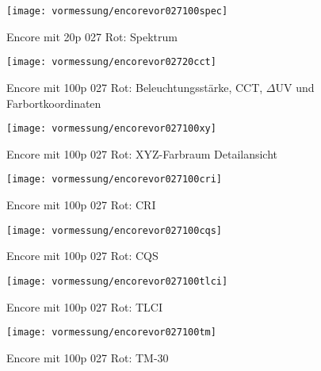 \documentclass[pagesize,paper=A4,fontsize=12pt,utf8,numbers=noenddot,bibliography=totoc,listof=totoc,DIV=11,BCOR=1mm]{scrreprt}
\begin{document}
\begin{figure}[htp]     %
\centering
\texttt{[image: vormessung/encorevor027100spec]} 
\caption {Encore mit 20p 027 Rot: Spektrum} 
\end{figure}

\begin{figure}[htp]     %
\centering
\texttt{[image: vormessung/encorevor02720cct]} 
\caption {Encore mit 100p 027 Rot: Beleuchtungsstärke, CCT, $\Delta$UV und Farbortkoordinaten} 
\end{figure}

\begin{figure}[htp]     %
\centering
\texttt{[image: vormessung/encorevor027100xy]} 
\caption {Encore mit 100p 027 Rot: XYZ-Farbraum Detailansicht} 
\end{figure}

\begin{figure}[htp]     %
\centering
\texttt{[image: vormessung/encorevor027100cri]} 
\caption {Encore mit 100p 027 Rot: CRI} 
\end{figure}

\begin{figure}[htp]     %
\centering
\texttt{[image: vormessung/encorevor027100cqs]} 
\caption {Encore mit 100p 027 Rot: CQS} 
\end{figure}

\begin{figure}[htp]     %
\centering
\texttt{[image: vormessung/encorevor027100tlci]} 
\caption {Encore mit 100p 027 Rot: TLCI} 
\end{figure}

\begin{figure}[htp]     %
\centering
\texttt{[image: vormessung/encorevor027100tm]} 
\caption {Encore mit 100p 027 Rot: TM-30} 
\end{figure}
\end{document}
